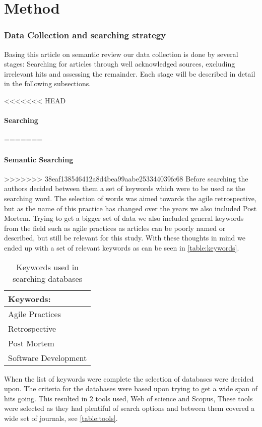 \documentclass{article}
\begin{document}
\part{Method}

\section{Data Collection and searching strategy}
Basing this article on semantic review our data collection is done by several stages: Searching for articles through well acknowledged sources, excluding irrelevant hits and assessing the remainder. Each stage will be described in detail in the following subsections.

<<<<<<< HEAD
\subsection{Searching}
=======
\subsection{Semantic Searching}
>>>>>>> 38eaf138546412a8d4bea99aabe253344039fc68
Before searching the authors decided between them a set of keywords which were to be used as the searching word. The selection of words was aimed towards the agile retrospective, but as the name of this practice has changed over the years we also included Post Mortem. Trying to get a bigger set of data we also included general keywords from the field such as agile practices as articles can be poorly named or described, but still be relevant for this study. With these thoughts in mind we ended up with a set of relevant keywords as can be seen in \autoref{table:keywords}.

\begin{table}[!h]
	\begin{center}
		\begin{tabular}{ l }
			Keywords: \\ \hline
			Agile Practices \\
			Retrospective \\
			Post Mortem \\
			Software Development \\
		\end{tabular}
		\caption{Keywords used in searching databases}
		\label{table:keywords}
	\end{center}
\end{table}

When the list of keywords were complete the selection of databases were decided upon. The criteria for the databases were based upon trying to get a wide span of hits going. This resulted in 2 tools used, Web of science and Scopus, These tools were selected as they had plentiful of search options and between them covered a wide set of journals, see \autoref{table:tools}. 
\end{document}
